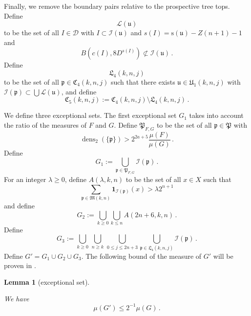 \documentclass[10pt,a4paper]{article}
\theoremstyle{plain}
\newtheorem{lemma}[theorem]{Lemma}
\theoremstyle{definition}
\numberwithin{equation}{subsection}
\DeclareMathOperator{\dens}{\operatorname{dens}}
\newcommand{\fp}{{\mathfrak p}}
\newcommand{\fP}{{\mathfrak P}}
\newcommand{\fu}{{\mathfrak u}}
\newcommand{\fU}{{\mathfrak U}}
\newcommand{\fL}{{\mathfrak L}}
\newcommand{\fC}{{\mathfrak C}}
\newcommand{\ps}{{\mathrm{s}}}
\newcommand{\scI}{{\mathcal{I}}} %
\newcommand{\lean}[1]{}
\newcommand{\uses}[1]{}
\newcommand{\leanok}{}
\begin{document}
Finally, we remove the boundary pairs relative to the prospective tree tops. Define
\begin{equation}
    \label{eq-L-def}
    \mathcal{L}(\fu)
\end{equation}
to be the set of all $I \in \mathcal{D}$ with $I \subset \scI(\fu)$ and $s(I) = \ps(\fu) - Z(n+1) - 1$ and
\begin{equation}
    B(c(I), 8 D^{s(I)})\not \subset \scI(\fu)\, .
\end{equation}
Define
\begin{equation}
    \label{eq-L4-def}
    \fL_4(k,n,j)
\end{equation}
to be the set of all $\fp\in \fC_4(k,n,j)$ such that there exists
$\fu\in \fU_1(k,n,j)$
with $\scI(\fp) \subset \bigcup \mathcal{L}(\fu)$, and define
\begin{equation}\label{defc5}
\fC_5(k,n,j):=\fC_4(k,n,j)
  \setminus \fL_4(k,n,j)\, .
\end{equation}


We define three exceptional sets.
The first exceptional set $G_1$ takes into account the ratio of the measures of $F$ and $G$.
Define $\fP_{F,G}$ to be the set of all $\fp\in \fP$
with
\begin{equation}
    \dens_2(\{\fp\})> 2^{2a+5}\frac{\mu(F)}{\mu(G)}\,.
\end{equation}
Define
\begin{equation}\label{definegone}
    G_1:=\bigcup_{\fp\in \fP_{F,G} }\scI(\fp)\, .
\end{equation}
For an integer $\lambda\ge 0$, define $A(\lambda,k,n)$ to be the set
of all $x\in X$ such that
\begin{equation}
    \label{eq-Aoverlap-def}
    \sum_{\fp \in \mathfrak{M}(k,n)}\mathbf{1}_{\scI(\fp)}(x)>\lambda 2^{n+1}
\end{equation}
and define
\begin{equation}\label{definegone2}
    G_2:=
\bigcup_{k\ge 0}\bigcup_{k\le n}
A(2n+6,k,n)\, .
\end{equation}
Define
    \begin{equation}\label{defineg3}
        G_3 :=
        \bigcup_{k\ge 0}\, \bigcup_{n \geq k}\,
        \bigcup_{0\le j\le 2n+3}
        \bigcup_{\fp \in \fL_4 (k,n,j)}
        \scI(\fp)\, .
     \end{equation}
Define $G'=G_1\cup G_2 \cup G_3$. The following bound of the measure of $G'$ will be proven in .
\begin{lemma}[exceptional set]
    \label{exceptional-set}
    \leanok
    \lean{exceptional_set}
    \uses{first-exception,second-exception, third-exception}
    We have
    \begin{equation}
        \mu(G')\le 2^{-1}\mu(G)\, .
    \end{equation}
\end{lemma}
\end{document}
